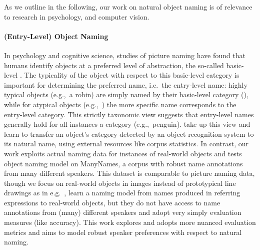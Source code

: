 

As we outline in the following, our work on natural object naming is of relevance to research in psychology, \langvis and computer vision. 

\paragraph{(Entry-Level) Object Naming}

%

In psychology and cognitive science, studies of picture naming have found that humans identify objects at a preferred level of abstraction, the so-called basic-level \cite{rosch1976basic,jolicoeur1984pictures}. 
The typicality of the object with respect to this basic-level category is important for determining the preferred name, i.e.\ the entry-level name: highly typical objects (e.g.,\ a robin) are simply named by their basic-level category (), while for atypical objects  (e.g.,\ ) the more specific name corresponds to the entry-level category. 
This strictly taxonomic view suggests that entry-level names generally hold for all instances a category (e.g.,\ penguin). 
 take up this view and learn to transfer an object's category detected by an object recognition system to its natural name, using external resources like corpus statistics. 
In contrast, our work exploits actual naming data for instances of real-world objects and tests object naming model on ManyNames, a corpus with robust name annotations from many different speakers.
This dataset is comparable to picture naming data, though we focus on real-world objects in images instead of prototypical line drawings as in e.g.\ \cite{rossion2004revisiting}, 
  learn a naming model from names produced in referring expressions to real-world objects, but they do not have access to name annotations from (many) different speakers and adopt very simply evaluation measures (like accuracy). 
 This work explores and adopts more nuanced evaluation metrics and aims to model robust speaker preferences with respect to natural naming.
 
